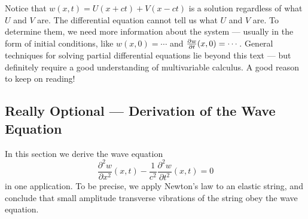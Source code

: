 \begin{eg}
Notice that $w(x,t) = U(x+ct) + V(x-ct)$ is a solution regardless of what
$U$ and $V$ are. The differential equation cannot tell us what $U$ and $V$
are. To determine them, we need more information about the system ---
usually in the form of initial conditions, like $w(x,0)=\cdots$
and $\pdiff{w}{t}(x,0)=\cdots$. General techniques for solving 
partial differential equations lie beyond this text --- but definitely
require a good understanding of multivariable calculus. A good reason to keep on reading! 

\end{eg}

\subsection{Really Optional --- Derivation of the Wave Equation}
      \label{sec wave deriv}

In this section we derive the wave equation 
\begin{equation*}
\frac{\partial^2 w}{\partial x^2}(x,t)
         -\frac{1}{c^2}\frac{\partial^2 w}{\partial t^2}(x,t)=0
\end{equation*}
in one application. To be precise, we apply Newton's law to an elastic 
string, and conclude that small amplitude transverse vibrations of the 
string obey the wave equation. 

